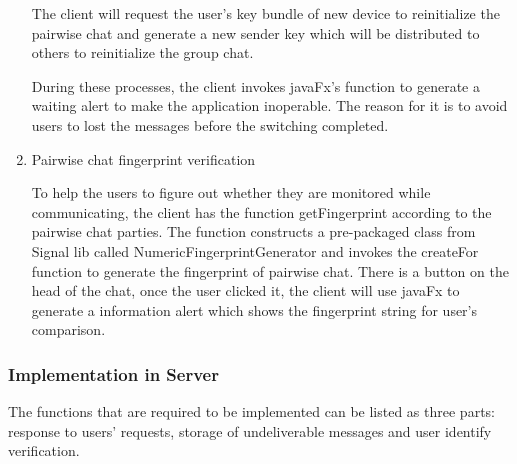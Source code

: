 \begin{enumerate}[label=(\roman*)]
The client will request the user's key bundle of new device to reinitialize the pairwise chat and generate a new sender key which will be distributed to others to reinitialize the group chat.

During these processes, the client invokes javaFx's function to generate a waiting alert to make the application inoperable. The reason for it is to avoid users to lost the messages before the switching completed.

\item Pairwise chat fingerprint verification

To help the users to figure out whether they are monitored while communicating, the client has the function getFingerprint according to the pairwise chat parties. The function constructs a pre-packaged class from Signal lib called NumericFingerprintGenerator and invokes the createFor function to generate the fingerprint of pairwise chat. There is a button on the head of the chat, once the user clicked it, the client will use javaFx to generate a information alert which shows the fingerprint string for user's comparison.
\end{enumerate}

\subsubsection{Implementation in Server}
The functions that are required to be implemented can be listed as three parts: response to users' requests, storage of undeliverable messages and user identify verification.

